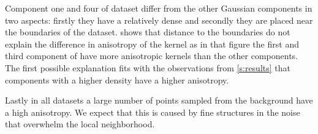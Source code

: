 				Component one and four of dataset \ferdosiThree differ from the other Gaussian components in two aspects: firstly they have a relatively dense and secondly they are placed near the boundaries of the dataset. 
					 shows that distance to the boundaries do not explain the difference in anisotropy of the kernel as in that figure the first and third component of \ferdosiThreeNoise have more anisotropic kernels than the other components.
					The first possible explanation fits with the observations from \cref{s:results} that components with a higher density have a higher anisotropy.


		Lastly in all datasets a large number of points sampled from the background have a high anisotropy. We expect that this is caused by fine structures in the noise that overwhelm the local neighborhood.



